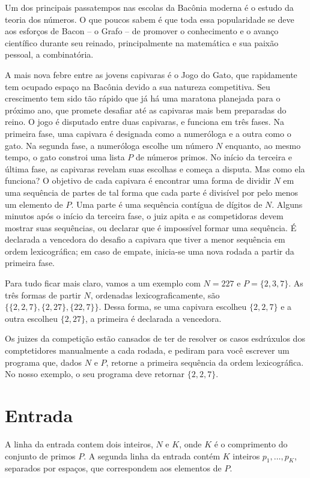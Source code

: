 Um dos principais passatempos nas escolas da Bacônia moderna é o estudo da teoria dos números. O que poucos sabem é
que toda essa popularidade se deve aos esforços de Bacon -- o Grafo -- de promover o conhecimento e o avanço
científico durante seu reinado, principalmente na matemática e sua paixão pessoal, a combinatória.

A mais nova febre entre as jovens capivaras é o Jogo do Gato, que rapidamente tem ocupado espaço na Bacônia devido a sua
natureza competitiva.
Seu crescimento tem sido tão rápido que já há uma maratona planejada para o próximo ano, que promete desafiar até as capivaras
mais bem preparadas do reino. O jogo é disputado entre duas capivaras, e funciona em três fases.
Na primeira fase, uma capivara é designada como a numeróloga e a outra como o gato.
Na segunda fase, a numeróloga escolhe um número $N$ enquanto, ao mesmo tempo, o gato constroi uma lista $P$ de números primos.
No início da terceira e última fase, as capivaras revelam suas escolhas e começa a disputa.
Mas como ela funciona? O objetivo de cada capivara é encontrar uma forma de dividir $N$ em uma sequência de partes
de tal forma que cada parte é divisível por pelo menos um elemento de $P$. Uma parte é uma sequência contígua de dígitos de $N$.
Alguns minutos após o início da terceira fase, o juiz apita e as competidoras devem mostrar suas sequências, ou declarar que é impossível
formar uma sequência.
É declarada a vencedora do desafio a capivara que tiver a menor sequência em ordem lexicográfica; em caso de empate,
inicia-se uma nova rodada a partir da primeira fase.

Para tudo ficar mais claro, vamos a um exemplo com $N = 227$ e $P = \{2, 3, 7\}$. As três formas de partir $N$, ordenadas lexicograficamente,
são $\{\{2,2,7\}, \{2,27\}, \{22,7\}\}$. Dessa forma, se uma capivara escolheu $\{2, 2, 7\}$ e a outra escolheu $\{2, 27\}$, a primeira é declarada
a vencedora.

Os juizes da competição estão cansados de ter de resolver os casos esdrúxulos dos comptetidores manualmente a cada rodada, e pediram para você
escrever um programa que, dados $N$ e $P$, retorne a primeira sequência da ordem lexicográfica. No nosso exemplo, o seu programa deve retornar
$\{2, 2, 7\}$.

\section*{Entrada}

A linha da entrada contem dois inteiros, $N$ e $K$, onde $K$ é o comprimento do conjunto de primos $P$.
A segunda linha da entrada contém $K$ inteiros $p_1, \dots, p_K$, separados por espaços, que correspondem aos elementos de $P$.

